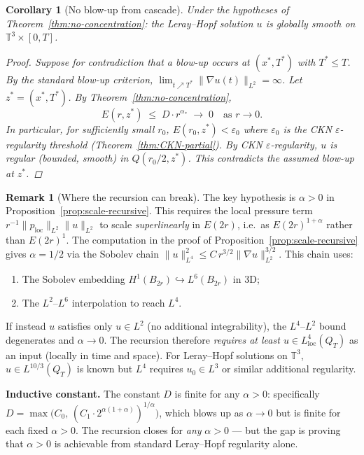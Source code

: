 \documentclass[11pt]{article}
\newtheorem{corollary}[theorem]{Corollary}
\theoremstyle{definition}
\newtheorem{remark}[theorem]{Remark}
\theoremstyle{remark}
\newcommand{\T}{\mathbb{T}}
\begin{document}
\begin{corollary}[No blow-up from cascade]\label{cor:no-blowup}
  Under the hypotheses of Theorem~\ref{thm:no-concentration}: the Leray--Hopf
  solution $u$ is globally smooth on $\T^3\times[0,T]$.

  \begin{proof}
    Suppose for contradiction that a blow-up occurs at $(x^*, T^*)$ with
    $T^*\leq T$.  By the standard blow-up criterion,
    $\lim_{t\nearrow T^*}\|\nabla u(t)\|_{L^2}=\infty$.
    Let $z^* = (x^*, T^*)$.  By Theorem~\ref{thm:no-concentration},
    \[
      E(r, z^*) \;\leq\; D\cdot r^{\alpha_*} \;\to\; 0 \quad\text{as }r\to 0.
    \]
    In particular, for sufficiently small $r_0$, $E(r_0, z^*) < \varepsilon_0$
    where $\varepsilon_0$ is the CKN $\varepsilon$-regularity threshold
    (Theorem~\ref{thm:CKN-partial}).  By CKN $\varepsilon$-regularity, $u$ is
    regular (bounded, smooth) in $Q(r_0/2, z^*)$.  This contradicts the assumed
    blow-up at $z^*$.
  \end{proof}
\end{corollary}

\begin{remark}[Where the recursion can break]\label{rem:recursion-caveat}
  The key hypothesis is $\alpha > 0$ in Proposition~\ref{prop:scale-recursive}.
  This requires the local pressure term
  $r^{-1}\|p_{\mathrm{loc}}\|_{L^2}\|u\|_{L^2}$ to scale \emph{superlinearly}
  in $E(2r)$, i.e.\ as $E(2r)^{1+\alpha}$ rather than $E(2r)^1$.  The
  computation in the proof of Proposition~\ref{prop:scale-recursive} gives
  $\alpha = 1/2$ via the Sobolev chain
  $\|u\|_{L^4}^2\leq C\,r^{3/2}\|\nabla u\|_{L^2}^{3/2}$.
  This chain uses:
  \begin{enumerate}
    \item[(a)] The Sobolev embedding $H^1(B_{2r})\hookrightarrow L^6(B_{2r})$ in 3D;
    \item[(b)] The $L^2$--$L^6$ interpolation to reach $L^4$.
  \end{enumerate}
  If instead $u$ satisfies only $u\in L^2$ (no additional integrability), the
  $L^4$--$L^2$ bound degenerates and $\alpha\to 0$.  The recursion therefore
  \emph{requires at least $u\in L^4_{\mathrm{loc}}(Q_T)$} as an input
  (locally in time and space).  For Leray--Hopf solutions on $\T^3$,
  $u\in L^{10/3}(Q_T)$ is known but $L^4$ requires $u_0\in L^3$ or
  similar additional regularity.

  \medskip
  \noindent\textbf{Inductive constant.}  The constant $D$ is finite for
  any $\alpha > 0$: specifically
  $D = \max\bigl(C_0,\, (C_1\cdot 2^{\alpha(1+\alpha)})^{1/\alpha}\bigr)$,
  which blows up as $\alpha\to 0$ but is finite for each fixed $\alpha>0$.
  The recursion closes for \emph{any} $\alpha>0$ — but the gap is proving that
  $\alpha > 0$ is achievable from standard Leray--Hopf regularity alone.
\end{remark}
\end{document}
